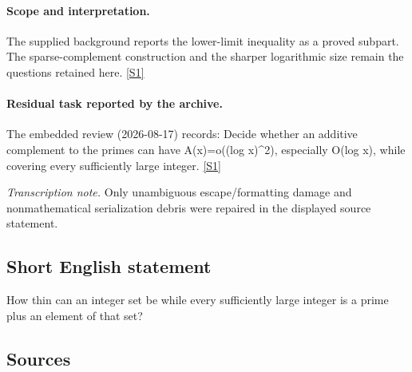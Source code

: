 \documentclass[11pt,a4paper]{article}
\newcommand{\sref}[2]{\hyperlink{source:#1:#2}{[S#2]}}
\begin{document}
\paragraph{Scope and interpretation.}

The supplied background reports the lower-limit inequality as a proved subpart. The sparse-complement construction and the sharper logarithmic size remain the questions retained here. \sref{1892}{1}

\paragraph{Residual task reported by the archive.}

The embedded review (2026-08-17) records: Decide whether an additive complement to the primes can have A(x)=o((log x)\textasciicircum{}2), especially O(log x), while covering every sufficiently large integer. \sref{1892}{1}

{\small\emph{Transcription note.} Only unambiguous escape/formatting damage and nonmathematical serialization debris were repaired in the displayed source statement.}

\subsection{Short English statement}

How thin can an integer set be while every sufficiently large integer is a prime plus an element of that set?

\subsection{Sources}
\end{document}
